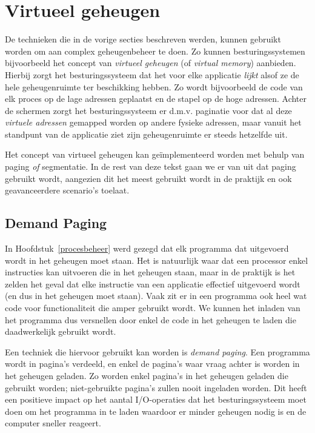 \section{Virtueel geheugen}

De technieken die in de vorige secties beschreven werden, kunnen gebruikt worden om aan complex geheugenbeheer te doen. Zo kunnen besturingssystemen bijvoorbeeld het concept van \emph{virtueel geheugen} (of \emph{virtual memory}) aanbieden. Hierbij zorgt het besturingssysteem dat het voor elke applicatie \emph{lijkt} alsof ze de hele geheugenruimte ter beschikking hebben. Zo wordt bijvoorbeeld de code van elk proces op de lage adressen geplaatst en de stapel op de hoge adressen. Achter de schermen zorgt het besturingssysteem er d.m.v. paginatie voor dat al deze \emph{virtuele adressen} gemapped worden op andere fysieke adressen, maar vanuit het standpunt van de applicatie ziet zijn geheugenruimte er steeds hetzelfde uit.

Het concept van virtueel geheugen kan ge\"implementeerd worden met behulp van paging \emph{of} segmentatie. In de rest van deze tekst gaan we er van uit dat paging gebruikt wordt, aangezien dit het meest gebruikt wordt in de praktijk en ook geavanceerdere scenario's toelaat.

\subsection{Demand Paging}

In Hoofdstuk~\ref{procesbeheer} werd gezegd dat elk programma dat uitgevoerd wordt in het geheugen moet staan. Het is natuurlijk waar dat een processor enkel instructies kan uitvoeren die in het geheugen staan, maar in de praktijk is het zelden het geval dat elke instructie van een applicatie effectief uitgevoerd wordt (en dus in het geheugen moet staan). Vaak zit er in een programma ook heel wat code voor functionaliteit die amper gebruikt wordt. We kunnen het inladen van het programma dus versnellen door enkel de code in het geheugen te laden die daadwerkelijk gebruikt wordt.

Een techniek die hiervoor gebruikt kan worden is \emph{demand paging}. Een programma wordt in pagina's verdeeld, en enkel de pagina's waar vraag achter is worden in het geheugen geladen. Zo worden enkel pagina's in het geheugen geladen die gebruikt worden; niet-gebruikte pagina's zullen nooit ingeladen worden. Dit heeft een positieve impact op het aantal I/O-operaties dat het besturingssysteem moet doen om het programma in te laden waardoor er minder geheugen nodig is en de computer sneller reageert.

